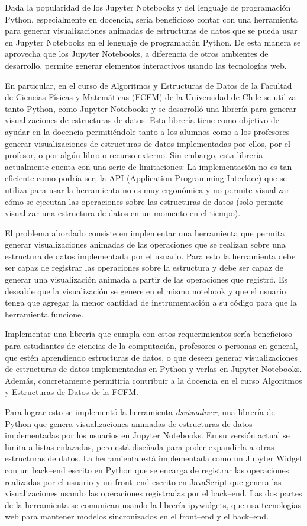 Dada la popularidad de los Jupyter Notebooks y del lenguaje de programación Python, especialmente en docencia, sería beneficioso contar con una herramienta para generar visualizaciones animadas de estructuras de datos que se pueda usar en Jupyter Notebooks en el lenguaje de programación Python. De esta manera se aprovecha que los Jupyter Notebooks, a diferencia de otros ambientes de desarrollo, permite generar elementos interactivos usando las tecnologías web.

En particular, en el curso de Algoritmos y Estructuras de Datos de la Facultad de Ciencias Físicas y Matemáticas (FCFM) de la Universidad de Chile se utiliza tanto Python, como Jupyter Notebooks y se desarrolló una librería para generar visualizaciones de estructuras de datos. Esta librería tiene como objetivo de ayudar en la docencia permitiéndole tanto a los alumnos como a los profesores generar visualizaciones de estructuras de datos implementadas por ellos, por el profesor, o por algún libro o recurso externo. Sin embargo, esta librería actualmente cuenta con una serie de limitaciones: La implementación no es tan eficiente como podría ser, la API (Application Programming Interface) que se utiliza para usar la herramienta no es muy ergonómica y no permite visualizar cómo se ejecutan las operaciones sobre las estructuras de datos (solo permite visualizar una estructura de datos en un momento en el tiempo).

El problema abordado consiste en implementar una herramienta que permita generar visualizaciones animadas de las operaciones que se realizan sobre una estructura de datos implementada por el usuario. Para esto la herramienta debe ser capaz de registrar las operaciones sobre la estructura y debe ser capaz de generar una visualización animada a partir de las operaciones que registró. Es deseable que la visualización se genere en el mismo notebook y que el usuario tenga que agregar la menor cantidad de instrumentación a su código para que la herramienta funcione.

Implementar una librería que cumpla con estos requerimientos sería beneficioso para estudiantes de ciencias de la computación, profesores o personas en general, que estén aprendiendo estructuras de datos, o que deseen generar visualizaciones de estructuras de datos implementadas en Python y verlas en Jupyter Notebooks. Además, concretamente permitiría contribuir a la docencia en el curso Algoritmos y Estructuras de Datos de la FCFM.

Para lograr esto se implementó la herramienta \textit{dsvisualizer}, una librería de Python que genera visualizaciones animadas de estructuras de datos implementadas por los usuarios en Jupyter Notebooks. En su versión actual se limita a listas enlazadas, pero está diseñada para poder expandirla a otras estructuras de datos. La herramienta está implementada como un Jupyter Widget con un back--end escrito en Python que se encarga de registrar las operaciones realizadas por el usuario y un front--end escrito en JavaScript que genera las visualizaciones usando las operaciones registradas por el back--end. Las dos partes de la herramienta se comunican usando la librería ipywidgets, que usa tecnologías web para mantener modelos sincronizados en el front--end y el back--end.

